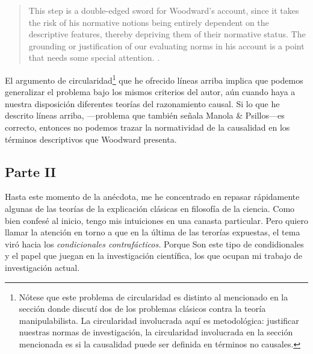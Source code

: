 \begin{quote}
  This step is a double-edged sword for Woodward’s account,
  since it takes the risk of his normative notions being
  entirely dependent on the descriptive features, thereby
  depriving them of their normative status. The grounding or
  justification of our evaluating norms in his account is a
  point that needs some special attention.
  \parencite[p.~305]{Manola2023}.
\end{quote}

El argumento de circularidad\footnote{
  Nótese que este problema de circularidad es distinto al
  mencionado en la sección donde discutí dos de los
  problemas clásicos contra la teoría manipulabilista. La circularidad involucrada
  aquí es metodológica: justificar nuestras normas
  de  investigación, la circularidad involucrada en la
  sección mencionada es si la causalidad puede ser definida
  en términos no causales. 
} 
que he ofrecido líneas arriba implica que podemos 
generalizar el problema bajo los mismos criterios del autor,
aún cuando haya a nuestra disposición diferentes teorías del
razonamiento causal. Si lo que he descrito líneas arriba,
---problema que también señala Manola \& Psillos---es
correcto, entonces no podemos trazar la normatividad de la
causalidad en los términos descriptivos que Woodward
presenta. 




\subsection{Parte II}


\noindent Hasta este momento de la anécdota, me he
concentrado en repasar rápidamente algunas de las teorías de
la explicación clásicas en filosofía de la ciencia. Como
bien confesé al inicio, tengo mis intuiciones en una canasta
particular. Pero quiero llamar la atención en torno a que en
la última de las terorías expuestas, el tema viró hacia los
\emph{condicionales contrafácticos.} Porque Son este tipo de
condidionales y el papel que juegan en la investigación
científica, los que ocupan mi trabajo de investigación
actual.

